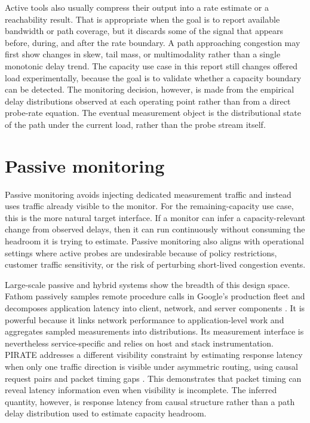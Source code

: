 Active tools also usually compress their output into a rate estimate or a reachability result. That is appropriate when the goal is to report available bandwidth or path coverage, but it discards some of the signal that appears before, during, and after the rate boundary. A path approaching congestion may first show changes in skew, tail mass, or multimodality rather than a single monotonic delay trend. The capacity use case in this report still changes offered load experimentally, because the goal is to validate whether a capacity boundary can be detected. The monitoring decision, however, is made from the empirical delay distributions observed at each operating point rather than from a direct probe-rate equation. The eventual measurement object is the distributional state of the path under the current load, rather than the probe stream itself.

\section{Passive monitoring}

Passive monitoring avoids injecting dedicated measurement traffic and instead uses traffic already visible to the monitor. For the remaining-capacity use case, this is the more natural target interface. If a monitor can infer a capacity-relevant change from observed delays, then it can run continuously without consuming the headroom it is trying to estimate. Passive monitoring also aligns with operational settings where active probes are undesirable because of policy restrictions, customer traffic sensitivity, or the risk of perturbing short-lived congestion events.

Large-scale passive and hybrid systems show the breadth of this design space. Fathom passively samples remote procedure calls in Google's production fleet and decomposes application latency into client, network, and server components \cite{qureshiFathom}. It is powerful because it links network performance to application-level work and aggregates sampled measurements into distributions. Its measurement interface is nevertheless service-specific and relies on host and stack instrumentation. PIRATE addresses a different visibility constraint by estimating response latency when only one traffic direction is visible under asymmetric routing, using causal request pairs and packet timing gaps \cite{shobhanaPirate}. This demonstrates that packet timing can reveal latency information even when visibility is incomplete. The inferred quantity, however, is response latency from causal structure rather than a path delay distribution used to estimate capacity headroom.


